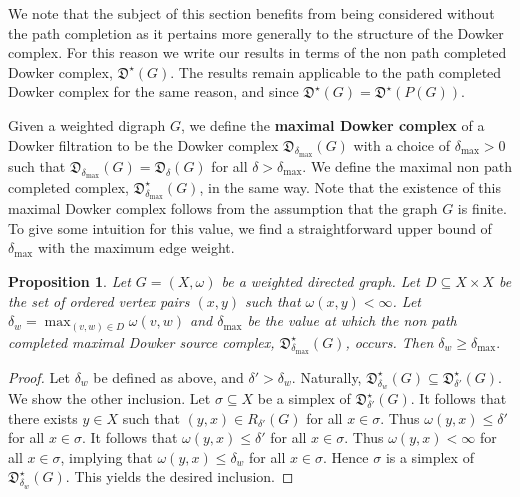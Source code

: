 \documentclass[pdflatex,bst/sn-mathphys-num]{sn-jnl}%
\theoremstyle{thmstyleone}%
\newtheorem{prop}[theorem]{Proposition}%
\theoremstyle{definition}
\theoremstyle{thmstyletwo}%
\newcommand{\FD}{\mathfrak{D}}
\theoremstyle{thmstylethree}%
\begin{document}
We note that the subject of this section benefits from being considered without the path completion as it pertains more generally to the structure of the Dowker complex. For this reason we write our results in terms of the non path completed Dowker complex, $\FD^\star(G)$. The results remain applicable to the path completed Dowker complex for the same reason, and since $\FD^\star(G)=\FD^\star(P(G))$.

Given a weighted digraph $G$, we define the \textbf{maximal Dowker complex} of a Dowker filtration to be the Dowker complex $\FD_{\delta_\text{max}}(G)$ with a choice of $\delta_\text{max} >0$ such that $\FD_{\delta_\text{max}}(G)=\FD_{\delta}(G)$ for all $\delta >\delta_\text{max}$. We define the maximal non path completed complex, $\FD^\star_{\delta_\text{max}}(G)$, in the same  way. Note that the existence of this maximal Dowker complex follows from the assumption that the graph $G$ is finite. To give some intuition for this value, we find a straightforward upper bound of $\delta_\text{max}$ with the maximum edge weight.

\begin{prop}
    Let $G=(X,\omega)$ be a weighted directed graph. Let $D\subseteq X\times X$ be the set of ordered vertex pairs $(x,y)$ such that $\omega(x,y)<\infty$.
    Let $\delta_w = \max_{(v,w)\in D}\omega(v,w)$ and $\delta_\text{max}$ be the value at which the non path completed maximal Dowker source complex, $\FD^\star_{\delta_\text{max}}(G)$, occurs. Then $\delta_w \geq \delta_\text{max}.$
\end{prop}
\begin{proof}
    Let $\delta_w$ be defined as above, and $\delta'>\delta_w$. Naturally, $\FD^\star_{\delta_w}(G)\subseteq \FD^\star_{\delta'}(G)$. We show the other inclusion. Let $\sigma\subseteq X$ be a simplex of $\FD^\star_{\delta'}(G)$. It follows that there exists $y\in X$ such that $(y,x)\in R_{\delta'}(G)$ for all $x\in \sigma$. Thus $\omega(y,x)\leq \delta'$ for all $x\in \sigma$. It follows that $\omega(y,x)\leq \delta'$ for all $x\in \sigma$. Thus $\omega(y,x)< \infty$ for all $x\in \sigma$, implying that $\omega(y,x)\leq \delta_w$ for all $x\in \sigma$. Hence $\sigma$ is a simplex of $\FD^\star_{\delta_w}(G)$.
    This yields the desired inclusion.
\end{proof}

\end{document}
